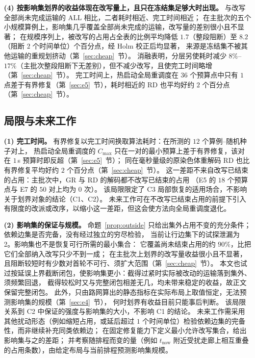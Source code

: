 \documentclass[manuscript,screen,review]{acmart}
\newcommand{\NPairs}{50}
\newcommand{\EfiveCells}{12}        %
\newcommand{\EfivePts}{36}          %
\newcommand{\ClosureAliveFrac}{90\%}
\newcommand{\ProbeLeaks}{2}
\begin{document}
\textbf{(4) 按影响集划界的收益体现在改写量上，且只在冻结集足够大时出现。}
与改写全部尚未完成运输的 ALL 相比，二者耗时相近、完工时间相近；
在主批次的五个小规模算例上，影响集几乎覆盖全部尚未完成的运输，改写量的差别很小且不显著；
在规模序列上，被改写的占用占全表的比例平均降低 \(1.7\)（整段阻断）至 \(8.2\)（阻断 \(2\) 个时间单位）个百分点，经 Holm 校正后均显著，
来源是冻结集不被其他运输的重规划挤动（第~\ref{sec:cheap}~节）。
消融表明，分层另使耗时减少 \(8\%\)--\(17\%\)（主批次整段阻断下无差别），但不减少改写，且使完工时间略增（第~\ref{sec:cheap}~节）。
完工时间上，热启动全局重调度在 \(\EfivePts\) 个预算点中只有 \(1\) 点差于有界修复（第~\ref{sec:e5}~节），耗时相近的 RD 也平均好约 \(2\) 个百分点（第~\ref{sec:cheap}~节）。

\subsection{局限与未来工作}
\label{sec:limitations}

\textbf{(1) 完工时间。}
有界修复以完工时间换取算法耗时：在所测的 \(\EfiveCells\) 个算例--随机种子对上，
热启动全局重调度的 \(C_{\max}\) 只在一对的最小预算上差于有界修复，该对在 \(1\)\,s 预算时即反超（第~\ref{sec:e5}~节）；
同在毫秒量级的原染色体重解码 RD 也比有界修复平均好约 \(2\) 个百分点（第~\ref{sec:cheap}~节）。
这一差距不来自改写已结束的占用：主批次中，GR 与 RD 的解码都不改写已结束的占用
（E5 的 \(18\) 个预算点与 E7 的 \(\NPairs\) 对上均为 \(0\) 次）。
该局限限定了 C3 局部恢复的适用场合，不影响关于划界对象的结论（C1、C2）。
未来工作可在不改写已结束占用的前提下引入有限度的改派或改序，以缩小这一差距，但这会使方法向全局重调度退化。

\textbf{(2) 影响集的保证与规模。}
命题~\ref{prop:outside} 只给出集外占用不变的充分条件；依赖边集是否完备，没有经过独立的穷尽检验，
当前让行边集下的试探泄漏为 \ProbeLeaks。影响集也不是恢复可行所需的最小集合：
它覆盖尚未结束占用的约 \(\ClosureAliveFrac\)，比把它们全部纳入改写只少不到一成；
在主批次上划界的改写量收益很小且不显著，且阻断较短时有少数对首轮不可行、须扩大范围（第~\ref{sec:cheap}~节）。
本文也试过按延误上界截断闭包，使影响集更小：截得过紧时实际被改动的运输落到集外、须频繁回退，
截得较松时又与完整闭包相差无几，均未带来稳定的收益，故正文保留完整闭包。
此外，只由路网算出的静态指标在实际布局上取值恒定，无法预测影响集的规模（第~\ref{sec:e4}~节），
何时划界有收益目前只能事后判断。
该局限关系到 C2 中保证的强度与影响集的大小，不影响 C1 的结论。
未来工作需采用其他扰动形态（例如缩短占用，或延后超过 \(1\) 个时间单位）检验依赖边集的完备性，而非继续补充同类依赖边；
在固定修复能力下定义最小允许改写集合，给出影响集与之的差距；
并考察随排程而变的量（例如 \(t_{\mathrm{now}}\) 附近受扰走廊上相互重叠的占用条数），由给定布局与当前排程预测影响集规模。
\end{document}
